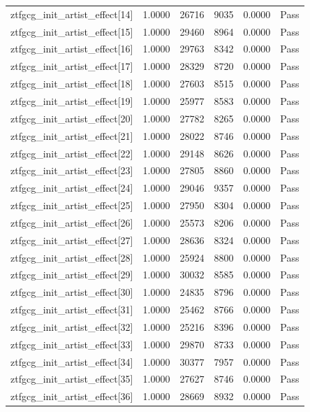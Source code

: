 \begin{table}[htbp]
\begin{tabular}{llrrll}
ztfgcg\_init\_artist\_effect[14] & 1.0000 & 26716 & 9035 & 0.0000 & Pass \\
ztfgcg\_init\_artist\_effect[15] & 1.0000 & 29460 & 8964 & 0.0000 & Pass \\
ztfgcg\_init\_artist\_effect[16] & 1.0000 & 29763 & 8342 & 0.0000 & Pass \\
ztfgcg\_init\_artist\_effect[17] & 1.0000 & 28329 & 8720 & 0.0000 & Pass \\
ztfgcg\_init\_artist\_effect[18] & 1.0000 & 27603 & 8515 & 0.0000 & Pass \\
ztfgcg\_init\_artist\_effect[19] & 1.0000 & 25977 & 8583 & 0.0000 & Pass \\
ztfgcg\_init\_artist\_effect[20] & 1.0000 & 27782 & 8265 & 0.0000 & Pass \\
ztfgcg\_init\_artist\_effect[21] & 1.0000 & 28022 & 8746 & 0.0000 & Pass \\
ztfgcg\_init\_artist\_effect[22] & 1.0000 & 29148 & 8626 & 0.0000 & Pass \\
ztfgcg\_init\_artist\_effect[23] & 1.0000 & 27805 & 8860 & 0.0000 & Pass \\
ztfgcg\_init\_artist\_effect[24] & 1.0000 & 29046 & 9357 & 0.0000 & Pass \\
ztfgcg\_init\_artist\_effect[25] & 1.0000 & 27950 & 8304 & 0.0000 & Pass \\
ztfgcg\_init\_artist\_effect[26] & 1.0000 & 25573 & 8206 & 0.0000 & Pass \\
ztfgcg\_init\_artist\_effect[27] & 1.0000 & 28636 & 8324 & 0.0000 & Pass \\
ztfgcg\_init\_artist\_effect[28] & 1.0000 & 25924 & 8800 & 0.0000 & Pass \\
ztfgcg\_init\_artist\_effect[29] & 1.0000 & 30032 & 8585 & 0.0000 & Pass \\
ztfgcg\_init\_artist\_effect[30] & 1.0000 & 24835 & 8796 & 0.0000 & Pass \\
ztfgcg\_init\_artist\_effect[31] & 1.0000 & 25462 & 8766 & 0.0000 & Pass \\
ztfgcg\_init\_artist\_effect[32] & 1.0000 & 25216 & 8396 & 0.0000 & Pass \\
ztfgcg\_init\_artist\_effect[33] & 1.0000 & 29870 & 8733 & 0.0000 & Pass \\
ztfgcg\_init\_artist\_effect[34] & 1.0000 & 30377 & 7957 & 0.0000 & Pass \\
ztfgcg\_init\_artist\_effect[35] & 1.0000 & 27627 & 8746 & 0.0000 & Pass \\
ztfgcg\_init\_artist\_effect[36] & 1.0000 & 28669 & 8932 & 0.0000 & Pass \\

\end{tabular}
\end{table}
